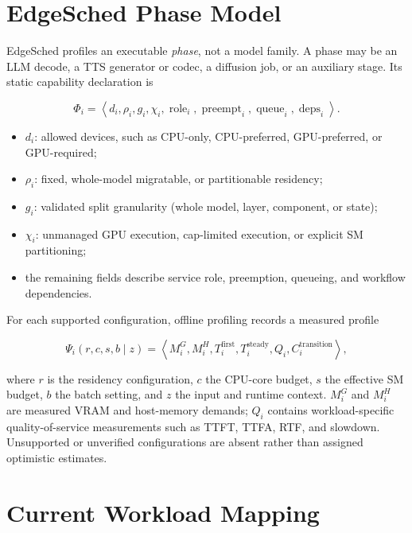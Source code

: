 \documentclass[10pt]{article}
\begin{document}
\section*{EdgeSched Phase Model}

EdgeSched profiles an executable \emph{phase}, not a model family.  A phase may
be an LLM decode, a TTS generator or codec, a diffusion job, or an auxiliary
stage.  Its static capability declaration is

\begin{equation}
\Phi_i = \left\langle
    d_i,\rho_i,g_i,\chi_i,
    \operatorname{role}_i,
    \operatorname{preempt}_i,
    \operatorname{queue}_i,
    \operatorname{deps}_i
\right\rangle .
\end{equation}

\begin{itemize}
    \item $d_i$: allowed devices, such as CPU-only, CPU-preferred,
          GPU-preferred, or GPU-required;
    \item $\rho_i$: fixed, whole-model migratable, or partitionable residency;
    \item $g_i$: validated split granularity (whole model, layer, component, or state);
    \item $\chi_i$: unmanaged GPU execution, cap-limited execution, or explicit
          SM partitioning;
    \item the remaining fields describe service role, preemption, queueing, and
          workflow dependencies.
\end{itemize}

For each supported configuration, offline profiling records a measured profile

\begin{equation}
\Psi_i(r,c,s,b\mid z)=\left\langle
    M_i^{G},M_i^{H},T_i^{\mathrm{first}},T_i^{\mathrm{steady}},
    Q_i,C_i^{\mathrm{transition}}
\right\rangle ,
\end{equation}

where $r$ is the residency configuration, $c$ the CPU-core budget, $s$ the
effective SM budget, $b$ the batch setting, and $z$ the input and runtime
context.  $M_i^G$ and $M_i^H$ are measured VRAM and host-memory demands; $Q_i$
contains workload-specific quality-of-service measurements such as TTFT, TTFA,
RTF, and slowdown.  Unsupported or unverified configurations are absent rather
than assigned optimistic estimates.

\section*{Current Workload Mapping}
\end{document}
